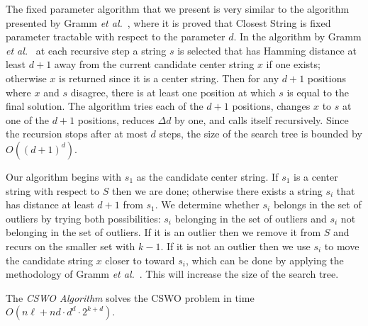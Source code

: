 The fixed parameter algorithm that we present is very similar to the algorithm presented by Gramm {\em et al.}\ \cite{GNR03}, where it is proved that {\sc Closest String} is fixed parameter tractable with respect to the parameter $d$. In the algorithm by Gramm {\em et al.}\ \cite{GNR03} at each recursive step a string $s$ is selected that has Hamming distance at least $d+1$ away from the current candidate center string $x$ if one exists; otherwise $x$ is returned since it is a center string.  Then for any $d+1$ positions where $x$ and $s$ disagree, there is at least one position at which $s$ is equal to the final solution.  The algorithm tries each of the $d+1$ positions, changes $x$ to $s$ at one of the $d+1$ positions, reduces $\Delta d$ by one, and calls itself recursively.  Since the recursion stops after at most $d$ steps, the size of the search tree is bounded by $O((d + 1)^d)$.

Our algorithm begins with $s_1$ as the candidate center string.  If $s_1$ is a center string with respect to $S$ then we are done; otherwise there exists a string $s_i$ that has distance at least $d + 1$ from $s_1$.  We determine whether $s_i$ belongs in the set of outliers by trying both possibilities: $s_i$ belonging in the set of outliers and $s_i$ not belonging in the set of outliers.  If it is an outlier then we remove it from $S$ and recurs on the smaller set with $k - 1$.  If it is not an outlier then we use $s_i$ to move the candidate string $x$ closer to toward $s_i$, which can be done by applying the methodology of Gramm {\em et al.}\ \cite{GNR03}. This will increase the size of the search tree.

\begin{proposition} The {\em CSWO Algorithm} solves the {\sc CSWO} problem in time $O(n \ell + n d \cdot d^d \cdot 2^{k+d})$. \end{proposition}


